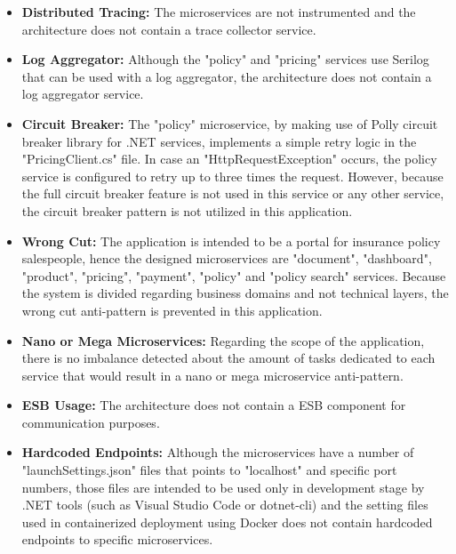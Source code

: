 \documentclass{Configuration_Files/PoliMi3i_thesis}
\begin{document}
\begin{itemize}
    \item \textbf{Distributed Tracing:} The microservices are not instrumented and the architecture does not contain a trace collector service.
    
    \item \textbf{Log Aggregator:} Although the "policy" and "pricing" services use Serilog that can be used with a log aggregator, the architecture does not contain a log aggregator service.
    
    \item \textbf{Circuit Breaker:} The "policy" microservice, by making use of Polly\footnotemark[106] circuit breaker library for .NET services, implements a simple retry logic in the "PricingClient.cs" file.
    In case an "HttpRequestException" occurs, the policy service is configured to retry up to three times the request.
    However, because the full circuit breaker feature is not used in this service or any other service, the circuit breaker pattern is not utilized in this application.
    
    \item \textbf{Wrong Cut:} The application is intended to be a portal for insurance policy salespeople, hence the designed microservices are "document", "dashboard", "product", "pricing", "payment", "policy" and "policy search" services.
    Because the system is divided regarding business domains and not technical layers, the wrong cut anti-pattern is prevented in this application.
    
    \item \textbf{Nano or Mega Microservices:} Regarding the scope of the application, there is no imbalance detected about the amount of tasks dedicated to each service that would result in a nano or mega microservice anti-pattern.
    
    \item \textbf{ESB Usage:} The architecture does not contain a ESB component for communication purposes.
    
    \item \textbf{Hardcoded Endpoints:} Although the microservices have a number of "launchSettings.json" files that points to "localhost" and specific port numbers, those files are intended to be used only in development stage by .NET tools (such as Visual Studio Code or dotnet-cli) and the setting files used in containerized deployment using Docker does not contain hardcoded endpoints to specific microservices.
    

\end{itemize}
\end{document}
